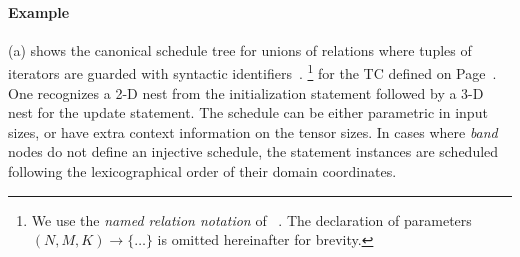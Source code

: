 \paragraph{Example}
(a) shows the canonical schedule tree
for unions of relations where tuples of
iterators are guarded with syntactic identifiers~\cite{Pugh1994Static}.%
\footnote{We use the
\emph{named relation notation} of ~\cite{Verdoolaege2011iscc}.
The declaration of parameters $(N,M,K) \rightarrow \{\dots\}$ is omitted
hereinafter for brevity.} for the  TC defined on
Page~\pageref{page:sgemm}.  One recognizes a 2-D nest from the initialization
statement followed by a 3-D nest for the update statement.  The schedule can be
either parametric in input sizes, or have extra context information on the
tensor sizes.  In cases where \emph{band} nodes do not define an injective
schedule, the statement instances are scheduled following the lexicographical
order of their domain coordinates.

%


